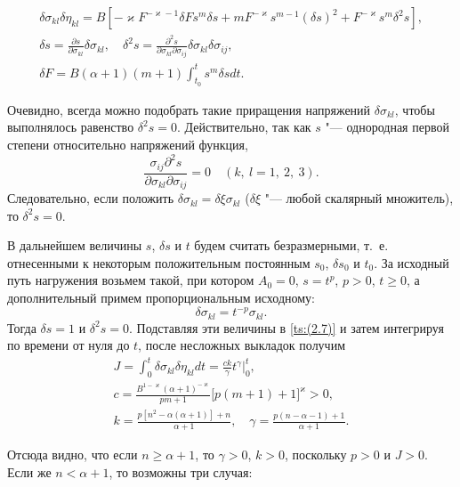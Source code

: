 \begin{equation}
\begin{array}{c}
\delta\sigma_{kl}\delta\eta_{kl}=B\left[-\varkappa F^{-\varkappa-1}\delta Fs^{m}\delta s+mF^{-\varkappa}s^{m-1}(\delta s)^{2}+F^{-\varkappa}s^{m}\delta^{2}s\right], \\[2mm]
\displaystyle \delta s=\frac{\partial s}{\partial\sigma_{kl}}\delta\sigma_{kl},\quad  
\delta^{2}s=\frac{\partial^{2}s}{\partial\sigma_{kl}\partial\sigma_{ij}}\delta\sigma_{kl}\delta\sigma_{ij},\\[2mm]
\displaystyle \delta F=B(\alpha+1)(m+1)\int_{t_{0}}^{t}s^{m}\delta s dt.
\end{array}
\label{ts:(2.7)}
\end{equation}

Очевидно, всегда можно подобрать такие приращения напряжений $\delta\sigma_{kl}$, 
чтобы выполнялось равенство $\delta^{2}s=0$. 
Действительно, так как $s$ "--- однородная первой степени относительно напряжений функция,  
$$
\frac{\sigma_{ij}\partial^{2}s}{\partial\sigma_{kl}\partial\sigma_{ij}}=0\quad   (k,\:l=1,\:2,\:3).
$$ 
Следовательно, если положить $\delta\sigma_{kl}=\delta\xi\sigma_{kl}$ ($\delta\xi$ "--- любой скалярный множитель), 
то $\delta^{2}s=0$.

В дальнейшем величины $s$, $\delta s$ и  $t$ будем считать безразмерными, т.~е. отнесенными к некоторым положительным постоянным $s_{0}$, $\delta s_{0}$ и $t_{0}$. 
За исходный путь нагружения возьмем такой, при котором $A_{0}=0$, $s=t^{p}$, $p>0$, $t\geq0$, а дополнительный примем пропорциональным исходному: 
$$
\delta\sigma_{kl}=t^{-p}\sigma_{kl}.
$$ 
Тогда $\delta s=1$ и $\delta^{2}s=0$. Подставляя эти величины в \eqref{ts:(2.7)} и затем интегрируя по времени от нуля до $t$, после несложных выкладок получим
\begin{gather}
J=\int_{0}^{t}\delta\sigma_{kl} \delta\eta_{kl} dt=\frac{c k}{\gamma}t^{\gamma}\Bigr|_{0}^{t},
\label{ts:(2.8)}
\\
c=\frac{B^{1-\varkappa}(\alpha+1)^{-\varkappa}}{pm+1}\bigl[p(m+1)+1\bigr]^{\varkappa}>0,
\\
k=\frac{p\left[n^{2}-\alpha(\alpha+1)\right]+n}{\alpha+1},\quad  \gamma=\frac{p(n-\alpha-1)+1}{\alpha+1}.
\end{gather}

Отсюда видно, что если $n\geq\alpha+1$, то $\gamma>0$, $k>0$, поскольку $p>0$ и $J>0$. 
Если же $n<\alpha+1$, то возможны три случая:

